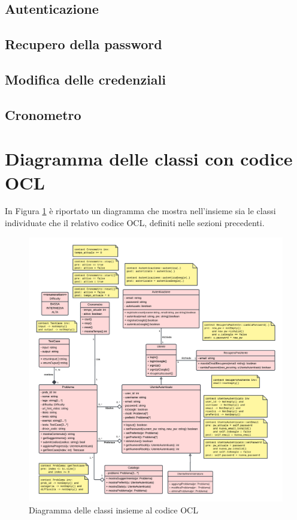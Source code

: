 \documentclass[11pt, a4paper]{article}
\theoremstyle{definition} %
\begin{document}
\subsection{Autenticazione}
\subsection{Recupero della password}
\subsection{Modifica delle credenziali}
\subsection{Cronometro}












\newpage
\section{Diagramma delle classi con codice OCL}
In Figura \ref{umlocl} è riportato un diagramma che mostra nell'insieme
sia le classi individuate che il relativo codice OCL, definiti nelle
sezioni precedenti.

\begin{figure}[H]
\centering
\hspace*{-2cm}
\includegraphics[scale = 0.54]{materiale/classdiagram.pdf}
\caption{Diagramma delle classi insieme al codice OCL}
\label{umlocl}
\end{figure}
\end{document}
